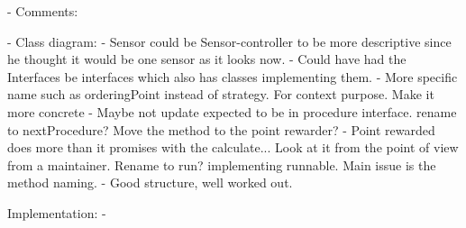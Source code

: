 
- Comments:

- Class diagram:
    - Sensor could be Sensor-controller to be more descriptive since he thought it would be one sensor as it looks now.
    - Could have had the Interfaces be interfaces which also has classes implementing them.
    - More specific name such as orderingPoint instead of strategy. For context purpose. Make it more concrete
    - Maybe not update expected to be in procedure interface. rename to nextProcedure? Move the method to the point rewarder? 
    - Point rewarded does more than it promises with the calculate... Look at it from the point of view from a maintainer. Rename to run? implementing runnable. Main issue is the method naming.
    - Good structure, well worked out.
    
Implementation:
    -     